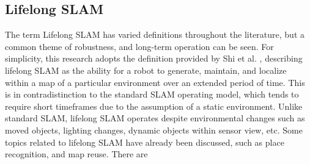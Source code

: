 \subsection{Lifelong SLAM}

The term Lifelong SLAM has varied definitions throughout the literature, but a common theme of robustness, and long-term operation can be seen. For simplicity, this research adopts the definition provided by Shi et al. \cite{shiAreWeReady2020}, describing lifelong SLAM as the ability for a robot to generate, maintain, and localize within a map of a particular environment over an extended period of time. This is in contradistinction to the standard SLAM operating model, which tends to require short timeframes due to the assumption of a static environment. Unlike standard SLAM, lifelong SLAM operates despite environmental changes such as moved objects, lighting changes, dynamic objects within sensor view, etc. Some topics related to lifelong SLAM have already been discussed, such as place recognition, and map reuse. There are 